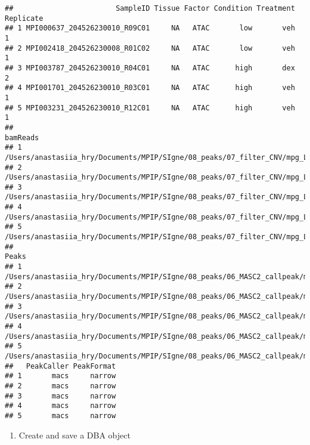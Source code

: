 \documentclass[
]{article}
\providecommand{\tightlist}{%
  \setlength{\itemsep}{0pt}\setlength{\parskip}{0pt}}
\begin{document}
\begin{verbatim}
##                        SampleID Tissue Factor Condition Treatment Replicate
## 1 MPI000637_204526230010_R09C01     NA   ATAC       low       veh         1
## 2 MPI002418_204526230008_R01C02     NA   ATAC       low       veh         1
## 3 MPI003787_204526230010_R04C01     NA   ATAC      high       dex         2
## 4 MPI001701_204526230010_R03C01     NA   ATAC      high       veh         1
## 5 MPI003231_204526230010_R12C01     NA   ATAC      high       veh         1
##                                                                                                                             bamReads
## 1  /Users/anastasiia_hry/Documents/MPIP/SIgne/08_peaks/07_filter_CNV/mpg_L18015_7C_veh_S26.cutadapt.sorted.filtered.rmDups.noCNV.bam
## 2 /Users/anastasiia_hry/Documents/MPIP/SIgne/08_peaks/07_filter_CNV/mpg_L18015_14D_veh_S33.cutadapt.sorted.filtered.rmDups.noCNV.bam
## 3 /Users/anastasiia_hry/Documents/MPIP/SIgne/08_peaks/07_filter_CNV/mpg_L18015_15B_dex_S72.cutadapt.sorted.filtered.rmDups.noCNV.bam
## 4 /Users/anastasiia_hry/Documents/MPIP/SIgne/08_peaks/07_filter_CNV/mpg_L18015_14B_veh_S60.cutadapt.sorted.filtered.rmDups.noCNV.bam
## 5 /Users/anastasiia_hry/Documents/MPIP/SIgne/08_peaks/07_filter_CNV/mpg_L18015_18D_veh_S62.cutadapt.sorted.filtered.rmDups.noCNV.bam
##                                                                                                                   Peaks
## 1  /Users/anastasiia_hry/Documents/MPIP/SIgne/08_peaks/06_MASC2_callpeak/mpg_L18015_7C_veh_S26_peaks.narrowPeak.filt.gz
## 2 /Users/anastasiia_hry/Documents/MPIP/SIgne/08_peaks/06_MASC2_callpeak/mpg_L18015_14D_veh_S33_peaks.narrowPeak.filt.gz
## 3 /Users/anastasiia_hry/Documents/MPIP/SIgne/08_peaks/06_MASC2_callpeak/mpg_L18015_15B_dex_S72_peaks.narrowPeak.filt.gz
## 4 /Users/anastasiia_hry/Documents/MPIP/SIgne/08_peaks/06_MASC2_callpeak/mpg_L18015_14B_veh_S60_peaks.narrowPeak.filt.gz
## 5 /Users/anastasiia_hry/Documents/MPIP/SIgne/08_peaks/06_MASC2_callpeak/mpg_L18015_18D_veh_S62_peaks.narrowPeak.filt.gz
##   PeakCaller PeakFormat
## 1       macs     narrow
## 2       macs     narrow
## 3       macs     narrow
## 4       macs     narrow
## 5       macs     narrow
\end{verbatim}

\begin{enumerate}
\def\labelenumi{\arabic{enumi}.}
\setcounter{enumi}{1}
\tightlist
\item
  Create and save a DBA object
\end{enumerate}
\end{document}
